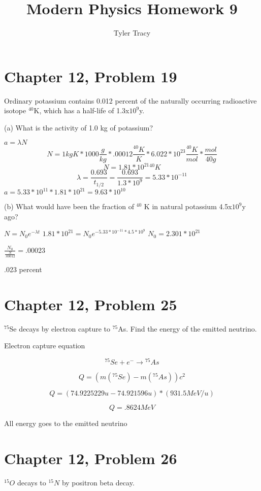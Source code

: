 \documentclass[12pt]{article}
\title{Modern Physics Homework 9}
\author{Tyler Tracy}
\begin{document}
\maketitle

\section*{Chapter 12, Problem 19}

Ordinary potassium contains 0.012 percent of the naturally occurring radioactive isotope ${}^{40}$K, which has a half-life of 1.3x$10^9$y.

(a) What is the activity of 1.0 kg of potassium?

$ a = \lambda N $
$$ N = 1kg K * 1000 \frac{g}{kg} * .00012 \frac{{}^{40}K}{K} * 6.022*10^{23} \frac{{}^{40}K}{mol} * \frac{mol}{40g}  $$
$$ N = 1.81 * 10^{21} {}^{40}K $$
$$ \lambda = \frac{0.693}{t_{1/2}} = \frac{0.693}{1.3*10^9} = 5.33 * 10^{-11}$$
$ a = 5.33 * 10^{11} * 1.81 * 10^{21} = 9.63*10^{10} $

(b) What would have been the fraction of ${}^{40}$ K in natural potassium 4.5x$10^9$y ago?

$ N = N_0 e^{-\lambda t} $
$ 1.81 * 10^{21} = N_0 e^{-5.33*10^{-11} * 4.5*10^9} $
$ N_0 = 2.301 * 10^{21} $

$ \frac{N_0}{\frac{N}{.00012}} = .00023 $

.023 percent

\section*{Chapter 12, Problem 25}
${}^{75}$Se decays by electron capture to ${}^{75}$As. Find the energy of the emitted neutrino.

Electron capture equation

$$ {}^{75}Se + e^{-} \rightarrow {}^{75}As$$

$$Q = (m({}^{75}Se) - m({}^{75}As))c^2$$

$$ Q= (74.9225229u - 74.921596u) * (931.5 MeV/u)$$

$$ Q = .8624 MeV $$

All energy goes to the emitted neutrino


\section*{Chapter 12, Problem 26}

${}^{15}O$ decays to ${}^{15}N$ by positron beta decay.
\end{document}
